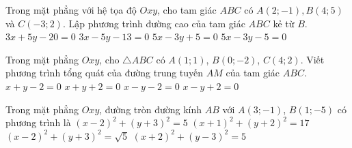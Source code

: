 \begin{ex}%
	Trong mặt phẳng với hệ tọa độ $O x y$, cho tam giác $A B C$ có $A(2;-1), B(4; 5)$ và $C(-3; 2)$. Lập phương trình đường cao của tam giác $A B C$ kẻ từ $B$.
	\choice
	{$3 x+5 y-20=0$}
	{$3 x-5 y-13=0$}
	{$5 x-3 y+5=0$}
	{\True $5 x-3 y-5=0$}
\end{ex}

\begin{ex}%
	Trong mặt phẳng $Oxy$, cho $\triangle A B C$ có $A(1 ; 1)$, $B(0 ;-2)$, $C(4 ; 2)$. Viết phương trình tổng quát của đường trung tuyến $A M$ của tam giác $A B C$.
	\choice
	{\True $x+y-2=0$}
	{$x+y+2=0$}
	{$x-y-2=0$}
	{$x-y+2=0$}
\end{ex}

\begin{ex}%
	Trong mặt phẳng $Oxy$, đường tròn đường kính $A B$ với $A(3;-1)$, $B(1 ;-5)$ có phương trình là 
	\choice
	{\True $(x-2)^2+(y+3)^2=5$}
	{$(x+1)^2+(y+2)^2=17$}
	{$(x-2)^2+(y+3)^2=\sqrt{5}$}
	{$(x+2)^2+(y-3)^2=5$}
\end{ex}

